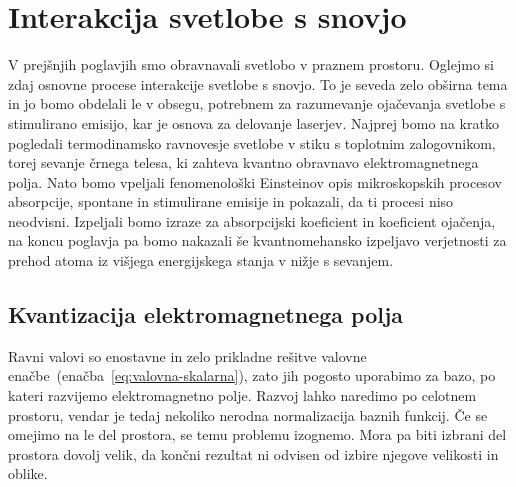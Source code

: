 \chapter{Interakcija svetlobe s snovjo}

V prejšnjih poglavjih smo obravnavali svetlobo v praznem prostoru. Oglejmo si
zdaj osnovne procese interakcije svetlobe s snovjo. To je seveda zelo
obširna tema in jo bomo obdelali le v obsegu, potrebnem za
razumevanje ojačevanja svetlobe s stimulirano emisijo, kar je osnova za
delovanje laserjev. Najprej bomo na kratko pogledali termodinamsko ravnovesje 
svetlobe v stiku s toplotnim zalogovnikom, torej sevanje črnega telesa, ki 
zahteva kvantno obravnavo elektromagnetnega polja. Nato bomo vpeljali fenomenološki
Einsteinov opis mikroskopskih procesov absorpcije, spontane in stimulirane
emisije in pokazali, da ti procesi niso neodvisni. Izpeljali bomo
izraze za absorpcijski koeficient in koeficient ojačenja, na koncu poglavja
pa bomo nakazali še kvantnomehansko izpeljavo verjetnosti za prehod
atoma iz višjega energijskega stanja v nižje s sevanjem.

\section{Kvantizacija elektromagnetnega polja}
Ravni valovi so enostavne in zelo prikladne rešitve valovne 
enačbe~(enačba~\ref{eq:valovna-skalarna}), zato jih pogosto uporabimo za 
bazo, po kateri razvijemo elektromagnetno polje. Razvoj
lahko naredimo po celotnem prostoru, vendar je tedaj nekoliko nerodna normalizacija baznih
funkcij. Če se omejimo na le del prostora, se temu problemu izognemo. Mora pa biti 
izbrani del prostora dovolj velik, da končni rezultat ni odvisen od izbire 
njegove velikosti in oblike.

